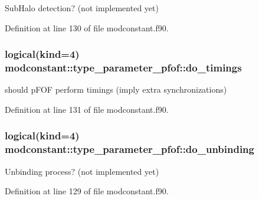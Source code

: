 Sub\+Halo detection? (not implemented yet) 



Definition at line 130 of file modconstant.\+f90.

\subsubsection[{\texorpdfstring{do\+\_\+timings}{do_timings}}]{\setlength{\rightskip}{0pt plus 5cm}logical(kind=4) modconstant\+::type\+\_\+parameter\+\_\+pfof\+::do\+\_\+timings}\hypertarget{structmodconstant_1_1type__parameter__pfof_af646b4ae96b024905287fdb0b75305da}{}\label{structmodconstant_1_1type__parameter__pfof_af646b4ae96b024905287fdb0b75305da}


should p\+F\+OF perform timings (imply extra synchronizations) 



Definition at line 131 of file modconstant.\+f90.

\subsubsection[{\texorpdfstring{do\+\_\+unbinding}{do_unbinding}}]{\setlength{\rightskip}{0pt plus 5cm}logical(kind=4) modconstant\+::type\+\_\+parameter\+\_\+pfof\+::do\+\_\+unbinding}\hypertarget{structmodconstant_1_1type__parameter__pfof_a4d8097905d8490a45d84b471ae1f5bb8}{}\label{structmodconstant_1_1type__parameter__pfof_a4d8097905d8490a45d84b471ae1f5bb8}


Unbinding process? (not implemented yet) 



Definition at line 129 of file modconstant.\+f90.

